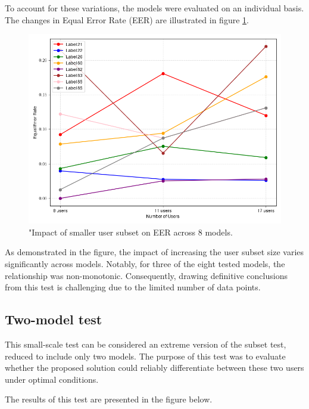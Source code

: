 To account for these variations, the models were evaluated on an individual basis. The changes in Equal Error Rate (EER) are illustrated in figure \ref{fig:subset_plot}.

\begin{figure}[H]
	\centering
	\includegraphics[width=.7\textwidth]{images/subset_test_res.png}
	\caption{"Impact of smaller user subset on EER across 8 models.}
	\label{fig:subset_plot}
\end{figure}

As demonstrated in the figure, the impact of increasing the user subset size varies significantly across models. Notably, for three of the eight tested models, the relationship was non-monotonic. Consequently, drawing definitive conclusions from this test is challenging due to the limited number of data points.

\subsection{Two-model test}
This small-scale test can be considered an extreme version of the subset test, reduced to include only two models. The purpose of this test was to evaluate whether the proposed solution could reliably differentiate between these two users under optimal conditions.

The results of this test are presented in the figure below.

